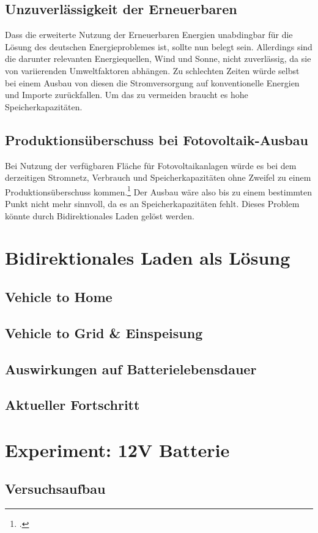 \documentclass[12pt]{article}
\begin{document}
    \subsection{Unzuverlässigkeit der Erneuerbaren}
    Dass die erweiterte Nutzung der Erneuerbaren Energien unabdingbar für die Lösung des deutschen Energieproblemes
    ist, sollte nun belegt sein. Allerdings sind die darunter relevanten Energiequellen, Wind und Sonne, nicht
    zuverlässig, da sie von variierenden Umweltfaktoren abhängen. Zu schlechten Zeiten würde selbst bei einem Ausbau
    von diesen die Stromversorgung auf konventionelle Energien und Importe zurückfallen. Um das zu vermeiden braucht
    es hohe Speicherkapazitäten.

    \subsection{Produktionsüberschuss bei Fotovoltaik-Ausbau}
    Bei Nutzung der verfügbaren Fläche für Fotovoltaikanlagen würde es bei dem derzeitigen Stromnetz, Verbrauch und
    Speicherkapazitäten ohne Zweifel zu einem Produktionsüberschuss kommen.\footcite{wirthAktuelleFaktenZur}
    Der Ausbau wäre also bis zu einem bestimmten Punkt nicht mehr sinnvoll, da es an Speicherkapazitäten fehlt.
    Dieses Problem könnte durch Bidirektionales Laden gelöst werden.


    \section{Bidirektionales Laden als Lösung}

    \subsection{Vehicle to Home}

    \subsection{Vehicle to Grid \& Einspeisung}

    \subsection{Auswirkungen auf Batterielebensdauer}

    \subsection{Aktueller Fortschritt}


    \section{Experiment: 12V Batterie}

    \subsection{Versuchsaufbau}
\end{document}
